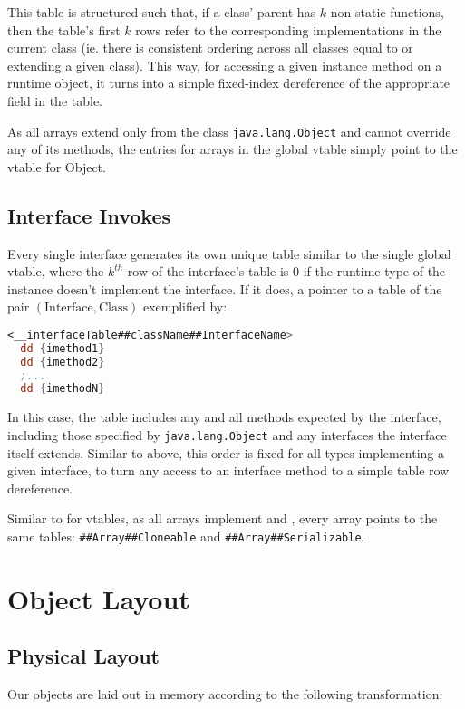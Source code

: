 \documentclass{article}
\begin{document}
This table is structured such that, if a class' parent has $k$ non-static functions, then the table's first $k$ rows
refer to the corresponding implementations in the current class (ie. there is consistent ordering across all classes
equal to or extending a given class). This way, for accessing a given instance method on a runtime object, it turns into
a simple fixed-index dereference of the appropriate field in the table.

As all arrays extend only from the class \texttt{java.lang.Object} and cannot override any of its methods, the entries
for arrays in the global vtable simply point to the vtable for Object.

\subsection{Interface Invokes}
Every single interface generates its own unique table similar to the single global vtable, where the $k^{th}$ row of the
interface's table is $0$ if the runtime type of the instance doesn't implement the interface. If it does, a pointer to a
table of the pair $(\text{Interface},\text{Class})$ exemplified by:

\begin{lstlisting}[language=nasm]
<__interfaceTable##className##InterfaceName>
  dd {imethod1}
  dd {imethod2}
  ;...
  dd {imethodN}
\end{lstlisting}

In this case, the table includes any and all methods expected by the interface, including those specified by
\texttt{java.lang.Object} and any interfaces the interface itself extends. Similar to above, this order is fixed for all
types implementing a given interface, to turn any access to an interface method to a simple table row dereference.

Similar to for vtables, as all arrays implement  and , every array points to the
same tables: \texttt{\#\#Array\#\#Cloneable} and \texttt{\#\#Array\#\#Serializable}.



\section{Object Layout}
\subsection{Physical Layout}
Our objects are laid out in memory according to the following transformation:
\end{document}
